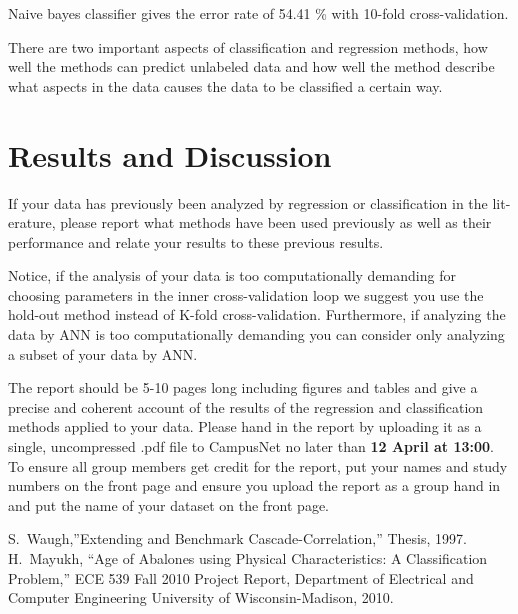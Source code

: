 \documentclass[10pt, paper=a4]{article}
\begin{document}
Naive bayes classifier gives the error rate of 54.41 \% with 10-fold
cross-validation.

There are two important aspects of classification and regression
methods, how well the methods can predict unlabeled data and how well
the method describe what aspects in the data causes the data to be
classified a certain way.


\section{Results and Discussion}
\label{sec:results_and_discussion}
If your data has previously been analyzed by regression or
classification in the lit- erature, please report what methods have
been used previously as well as their performance and relate your
results to these previous results.

Notice, if the analysis of your data is too computationally demanding
for choosing parameters in the inner cross-validation loop we suggest
you use the hold-out method instead of K-fold
cross-validation. Furthermore, if analyzing the data by ANN is too
computationally demanding you can consider only analyzing a subset of
your data by ANN.

The report should be 5-10 pages long including figures and tables and
give a precise and coherent account of the results of the regression
and classification methods applied to your data. Please hand in the
report by uploading it as a single, uncompressed .pdf file to
CampusNet no later than {\bf 12 April at 13:00}.  To ensure all group
members get credit for the report, put your names and study numbers on
the front page and ensure you upload the report as a group hand in and
put the name of your dataset on the front page.
\begin{thebibliography}{99}
 S.~Waugh,''Extending and Benchmark
  Cascade-Correlation,'' Thesis, 1997.
   H.~Mayukh, ``Age of Abalones using Physical
    Characteristics: A Classification Problem,'' ECE 539 Fall 2010
    Project Report, Department of Electrical and Computer Engineering
    University of Wisconsin-Madison, 2010.
\end{thebibliography}
\end{document}
